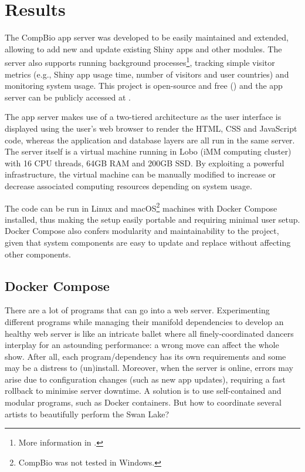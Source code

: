 \section{Results}

The CompBio app server was developed to be easily maintained and extended, allowing to add new and update existing Shiny apps and other modules. The server also supports running background processes\footnote{More information in .}, tracking simple visitor metrics (e.g., Shiny app usage time, number of visitors and user countries) and monitoring system usage. This project is open-source and free () and the app server can be publicly accessed at .

The app server makes use of a two-tiered architecture as the user interface is displayed using the user's web browser to render the HTML, CSS and JavaScript code, whereas the application and database layers are all run in the same server. The server itself is a virtual machine running in Lobo (iMM computing cluster) with 16 CPU threads, 64GB RAM and 200GB SSD. By exploiting a powerful infrastructure, the virtual machine can be manually modified to increase or decrease associated computing resources depending on system usage.

The code can be run in Linux and macOS\footnote{CompBio was not tested in Windows.} machines with Docker Compose installed, thus making the setup easily portable and requiring minimal user setup. Docker Compose also confers modularity and maintainability to the project, given that system components are easy to update and replace without affecting other components.

\subsection{Docker Compose}

There are a lot of programs that can go into a web server. Experimenting different programs while managing their manifold dependencies to develop an healthy web server is like an intricate ballet where all finely-coordinated dancers interplay for an astounding performance: a wrong move can affect the whole show. After all, each program/dependency has its own requirements and some may be a distress to (un)install. Moreover, when the server is online, errors may arise due to configuration changes (such as new app updates), requiring a fast rollback to minimise server downtime. A solution is to use self-contained and modular programs, such as Docker containers. But how to coordinate several artists to beautifully perform the Swan Lake?

